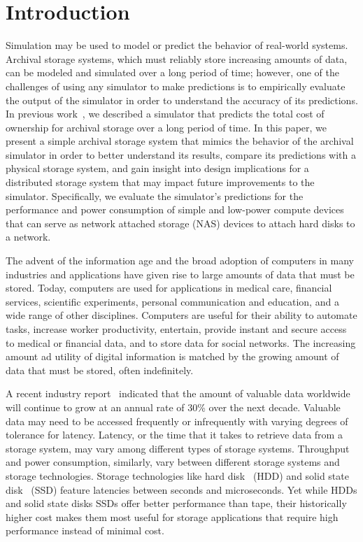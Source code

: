 \section{Introduction}
Simulation may be used to model or predict the behavior of real-world systems.  Archival storage systems, which must reliably store increasing amounts of data, can be modeled and simulated over a long period of time; however, one of the challenges of using any simulator to make predictions is to empirically evaluate the output of the simulator in order to understand the accuracy of its predictions.  In previous work~\cite{byronmaster}, we described a simulator that predicts the total cost of ownership for archival storage over a long period of time.  In this paper, we present a simple archival storage system that mimics the behavior of the archival simulator in order to better understand its results, compare its predictions with a physical storage system, and gain insight into design implications for a distributed storage system that may impact future improvements to the simulator.  Specifically, we evaluate the simulator's predictions for the performance and power consumption of simple and low-power compute devices that can serve as network attached storage (NAS) devices to attach hard disks to a network.

The advent of the information age and the broad adoption of computers in many industries and applications have given rise to large amounts of data that must be stored.  Today, computers are used for applications in medical care, financial services, scientific experiments, personal communication and education, and a wide range of other disciplines.  Computers are useful for their ability to automate tasks, increase worker productivity, entertain, provide instant and secure access to medical or financial data, and to store data for social networks.  The increasing amount ad utility of digital information is matched by the growing amount of data that must be stored, often indefinitely.

A recent industry report~\cite{idc1} indicated that the amount of valuable data worldwide will continue to grow at an annual rate of 30\% over the next decade.  Valuable data may need to be accessed frequently or infrequently with varying degrees of tolerance for latency.  Latency, or the time that it takes to retrieve data from a storage system, may vary among different types of storage systems.  Throughput and power consumption, similarly, vary between different storage systems and storage technologies.  Storage technologies like hard disk~\cite{web41} (HDD) and solid state disk~\cite{web39} (SSD) feature latencies between seconds and microseconds.  Yet while HDDs and solid state disks SSDs offer better performance than tape, their historically higher cost makes them most useful for storage applications that require high performance instead of minimal cost.

